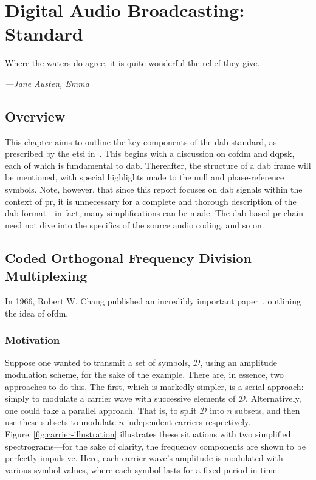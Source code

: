 \documentclass[class=report,11pt,crop=false]{standalone}
\begin{document}
\ifstandalone
\tableofcontents
\fi
\chapter{Digital Audio Broadcasting: Standard}
\epigraph{Where the waters do agree, it is quite wonderful the relief they give.}%
{\emph{---Jane Austen, Emma}}

\section{Overview}
This chapter aims to outline the key components of the \gls{dab} standard, as prescribed by the \gls{etsi} in~\cite{dabstandard}. This begins with a discussion on \gls{cofdm} and \gls{dqpsk}, each of which is fundamental to \gls{dab}. Thereafter, the structure of a \gls{dab} frame will be mentioned, with special highlights made to the null and phase-reference symbols. Note, however, that since this report focuses on \gls{dab} signals within the context of \gls{pr}, it is unnecessary for a complete and thorough description of the \gls{dab} format---in fact, many simplifications can be made. The \gls{dab}-based \gls{pr} chain need not dive into the specifics of the source audio coding, and so on.

\section{Coded Orthogonal Frequency Division Multiplexing}
In 1966, Robert W. Chang published an incredibly important paper~\cite{Chang1966}, outlining the idea of \gls{ofdm}.

\subsection{Motivation}
Suppose one wanted to transmit a set of symbols, \(\mathcal{D}\), using an amplitude modulation scheme, for the sake of the example. There are, in essence, two approaches to do this. The first, which is markedly simpler, is a serial approach: simply to modulate a carrier wave with successive elements of \(\mathcal{D}\). Alternatively, one could take a parallel approach. That is, to split \(\mathcal{D}\) into \(n\) subsets, and then use these subsets to modulate \(n\) independent carriers respectively. Figure~\ref{fig:carrier-illustration} illustrates these situations with two simplified spectrograms---for the sake of clarity, the frequency components are shown to be perfectly impulsive. Here, each carrier wave's amplitude is modulated with various symbol values, where each symbol lasts for a fixed period in time.
\end{document}
